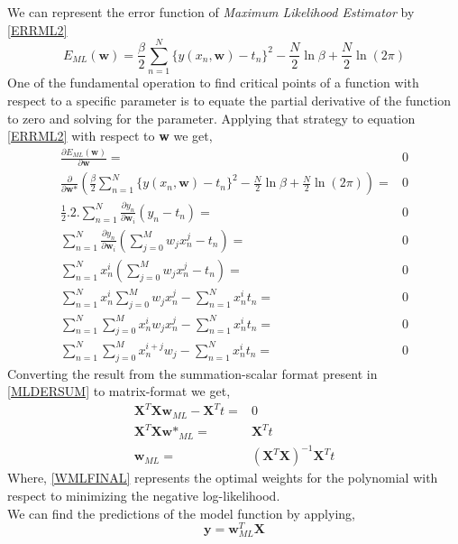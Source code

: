 \documentclass[12pt,twoside,a4paper]{article}
\begin{document}
We can represent the error function of \textit{Maximum Likelihood Estimator} by \eqref{ERRML2}
\begin{equation}\label{ERRML2}
    E_{ML}(\textbf{w}) = \frac{\beta}{2}\sum_{n=1}^{N} {\{y(x_n,\textbf{w})-t_n\}^2} - \frac{N}{2}\ln\beta + \frac{N}{2}\ln(2\pi)
\end{equation}
One of the fundamental operation to find critical points of a function with respect to a specific parameter is to equate the partial derivative of the function to zero and solving for the parameter. Applying that strategy to equation \eqref{ERRML2} with respect to \textbf{w} we get,
\begin{align}
\frac{\partial E_{ML}(\textbf{w})}{\partial \textbf{w}} =& 0\\
\frac{\partial}{\partial \textbf{w*}} \left( \frac{\beta}{2}\sum_{n=1}^{N} {\{y(x_n,\textbf{w})-t_n\}^2} - \frac{N}{2}\ln\beta + \frac{N}{2}\ln(2\pi) \right ) =& 0 \\
\frac{1}{2}.2.\sum_{n=1}^{N}\frac{\partial y_n}{\partial \textbf{w}_i}(y_n-t_n) =& 0 \\
\sum_{n=1}^{N}\frac{\partial y_n}{\partial \textbf{w}_i}(\sum_{j=0}^{M}{w_jx^j_n}-t_n) =& 0 \\
\sum_{n=1}^{N}x_n^i(\sum_{j=0}^{M}{w_jx^j_n}-t_n) =& 0 \\
\sum_{n=1}^{N}x_n^i\sum_{j=0}^{M}{w_jx^j_n} - \sum_{n=1}^{N}x_n^it_n =& 0 \\
\sum_{n=1}^{N}\sum_{j=0}^{M}{x_n^iw_jx^j_n} - \sum_{n=1}^{N}x_n^it_n =& 0 \\
\sum_{n=1}^{N}\sum_{j=0}^{M}{x^{i+j}_nw_j} - \sum_{n=1}^{N}x_n^it_n =& 0 \label{MLDERSUM}
\end{align}
Converting the result from the summation-scalar format present in \eqref{MLDERSUM} to matrix-format we get,
\begin{align}
\textbf{X}^T\textbf{X}\textbf{w}_{ML} - \textbf{X}^Tt =& 0 \\
\textbf{X}^T\textbf{X}\textbf{w*}_{ML} =& \textbf{X}^Tt \\
\textbf{w}_{ML} =& (\textbf{X}^T\textbf{X})^{-1}\textbf{X}^Tt \label{WMLFINAL}
\end{align}
Where, \eqref{WMLFINAL} represents the optimal weights for the polynomial with respect to minimizing the negative log-likelihood.\\
We can find the predictions of the model function by applying,
\begin{equation} \label{MLPRED}
    \textbf{y} = \textbf{w}^T_{ML}\textbf{X}
\end{equation}
\end{document}
